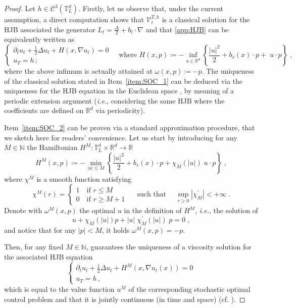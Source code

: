 \documentclass[final,12pt]{colt2023} %
\def\ie{\textit{i.e.}}
\newcommand{\bbRD}{\mathbb{R}^d}
\newcommand{\bes}{\begin{equation}}
\newcommand{\ees}{\end{equation}}
\def\ie{\textit{i.e.}}
\def\eqsp{\;}
\begin{document}
\begin{proof}
Let $h\in\mathcal{C}^3(\mathbb{T}_L^d)$. Firstly, let us observe that, under the current assumption, a direct computation shows that $\mathcal{V}^{T,h}_t$ is a classical solution for the HJB associated the generator $L_t=\frac{\Delta}{2}+b_t\cdot\nabla$ and that
\eqref{app:HJB} can be equivalently written as
\bes
\begin{cases}
\partial_t u_t+\frac12\Delta u_t+H(x,\nabla u_t)=0\\
u_T=h\,;
\end{cases}\quad\text{where }H(x,p)\coloneqq -\inf_{u\in\bbRD}\left\{\frac{|u|^2}{2}+b_s(x)\cdot p+\eqsp u\cdot p\right\} \eqsp,
\ees
where the above infimum is actually attained at $\omega(x,p)\coloneqq -p$. The uniqueness of the classical solution stated in Item~\ref{item:SOC_1} can be deduced via the uniqueness for the HJB equation in the Euclidean space \cite[Proposition 3.1]{conforti2022coupling}, by meaning of a periodic extension argument (\ie, considering the same HJB where the coefficients are defined on $\bbRD$ via periodicity).

\medskip

Item~\ref{item:SOC_2} can be proven
 via a standard approximation procedure,  that we sketch here for readers' convenience. 
Let us start by introducing for any $M\in\mathbb{N}$ the Hamiltonian $H^M\colon \mathbb{T}^d_L\times \bbRD\to \mathbb{R}$
\bes
H^M(x,p)\coloneqq -\min_{|u|\leq M}\left\{\frac{|u|^2}{2}+b_s(x)\cdot p+\chi_M(|u|)\eqsp u\cdot p\right\}\eqsp,
\ees
where $\chi^M$ is a smooth function satisfying
\bes
\chi^M(r)=\begin{cases}
    1\quad\text{if }r\leq M\\
    0\quad\text{if }r\geq M+1
\end{cases}\quad\text{ such that }\quad\sup_{r\geq 0}\left|\chi_M^{'}\right|<+\infty\eqsp.
\ees
Denote with $\omega^M(x,p)$ the optimal $u$ in the definition of $H^M$, \ie, the solution of
\bes
u+\chi_M(|u|)p+|u|\eqsp\chi_M^{'}(|u|)\eqsp p=0\eqsp,
\ees
and notice that for any $|p|< M$, it holds $\omega^M(x,p)=-p$.

Then, for any fixed $M\in\mathbb{N}$, \cite[Theorem 3.1]{zhu2011} guarantees the uniqueness of  a viscosity solution for the associated HJB equation
\begin{equation}\label{app:hjb:troncata}
\begin{cases}
\partial_t u_t+\frac12\Delta u_t+H^M(x,\nabla u_t(x))=0\\
u_T=h\,,
\end{cases}
\end{equation}
which is equal to the value function $u^M$ of the corresponding stochastic optimal control problem and that it is jointly continuous (in time and space) (cf. \cite[Theorem 3.7 and Remark 2.7]{zhu2010}). 


\end{proof}
\end{document}
